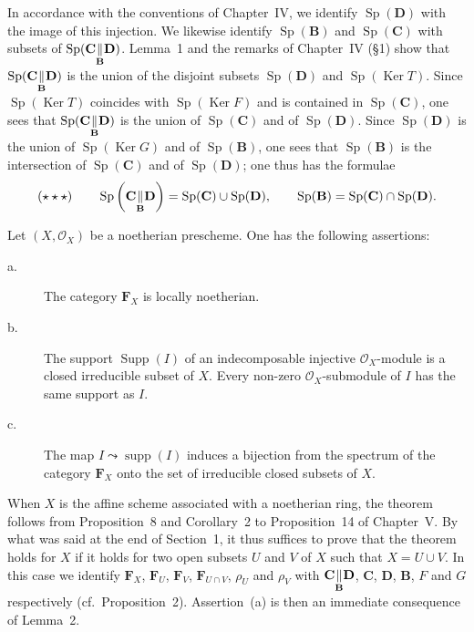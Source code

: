 In accordance with the conventions of Chapter~IV, we identify
$\operatorname{Sp}(\mathbf{D})$ with the image of this injection. We
likewise identify $\operatorname{Sp}(\mathbf{B})$ and
$\operatorname{Sp}(\mathbf{C})$ with subsets of
$\operatorname{Sp}(\mathbf{C} \underset{\mathbf{B}}{\Vert} \mathbf{D})$.
Lemma~1 and the remarks of Chapter~IV (\S1) show that
$\operatorname{Sp}(\mathbf{C} \underset{\mathbf{B}}{\Vert} \mathbf{D})$ is the
union of the disjoint subsets $\operatorname{Sp}(\mathbf{D})$ and
$\operatorname{Sp}(\operatorname{Ker} T)$. Since
$\operatorname{Sp}(\operatorname{Ker} T)$ coincides with
$\operatorname{Sp}(\operatorname{Ker} F)$ and is contained in
$\operatorname{Sp}(\mathbf{C})$, one sees that
$\operatorname{Sp}(\mathbf{C} \underset{\mathbf{B}}{\Vert} \mathbf{D})$ is the
union of $\operatorname{Sp}(\mathbf{C})$ and of
$\operatorname{Sp}(\mathbf{D})$. Since
$\operatorname{Sp}(\mathbf{D})$ is the union of
$\operatorname{Sp}(\operatorname{Ker} G)$ and of
$\operatorname{Sp}(\mathbf{B})$, one sees that
$\operatorname{Sp}(\mathbf{B})$ is the intersection of
$\operatorname{Sp}(\mathbf{C})$ and of $\operatorname{Sp}(\mathbf{D})$;
one thus has the formulae
\[
(\star\star\star)\qquad
\operatorname{Sp}\left(
\mathbf{C} \underset{\mathbf{B}}{\Vert} \mathbf{D}\right)
= \operatorname{Sp}(\mathbf{C}) \cup \operatorname{Sp}(\mathbf{D}),\qquad
\operatorname{Sp}(\mathbf{B})
= \operatorname{Sp}(\mathbf{C}) \cap \operatorname{Sp}(\mathbf{D}).
\]

\begin{theorem}
Let $(X, \mathcal{O}_X)$ be a noetherian prescheme. One has the
following assertions:
\begin{description}
\item[\normalfont a.] The category $\mathbf{F}_X$ is locally noetherian.
\item[\normalfont b.] The support $\operatorname{Supp}(I)$ of an
      indecomposable injective $\mathcal{O}_X$-module is a closed
      irreducible subset of $X$. Every non-zero
      $\mathcal{O}_X$-submodule of $I$ has the same support as $I$.
\item[\normalfont c.] The map $I \leadsto \operatorname{supp}(I)$
      induces a bijection from the spectrum of the category
      $\mathbf{F}_X$ onto the set of irreducible closed subsets of $X$.
\end{description}
\end{theorem}

When $X$ is the affine scheme associated with a noetherian ring, the
theorem follows from Proposition~8 and Corollary~2 to Proposition~14 of
Chapter~V. By what was said at the end of Section~1, it thus suffices
to prove that the theorem holds for $X$ if it holds for two open subsets
$U$ and $V$ of $X$ such that $X = U \cup V$. In this case we identify
$\mathbf{F}_X$, $\mathbf{F}_U$, $\mathbf{F}_V$,
$\mathbf{F}_{U \cap V}$, $\rho_U$ and $\rho_V$ with
$\mathbf{C} \underset{\mathbf{B}}{\Vert} \mathbf{D}$, $\mathbf{C}$,
$\mathbf{D}$, $\mathbf{B}$, $F$ and $G$ respectively (cf.\
Proposition~2). Assertion~(a) is then an immediate consequence of
Lemma~2.

